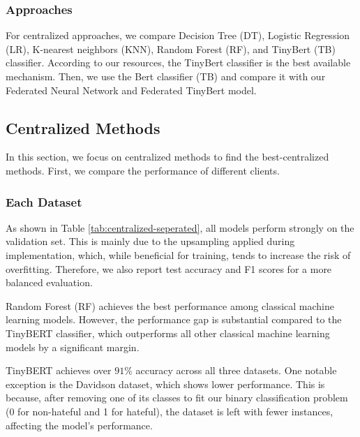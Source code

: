 \documentclass[11pt]{article}
\begin{document}
\subsubsection{Approaches}
For centralized approaches, we compare Decision Tree (DT), Logistic Regression (LR), K-nearest neighbors (KNN), Random Forest (RF), and TinyBert (TB) classifier. According to our resources, the TinyBert classifier is the best available mechanism. Then, we use the Bert classifier (TB) and compare it with our Federated Neural Network and Federated TinyBert model. 

\subsection{Centralized Methods}
In this section, we focus on centralized methods to find the best-centralized methods. First, we compare the performance of different clients.
\subsubsection{Each Dataset}
As shown in Table \ref{tab:centralized-seperated}, all models perform strongly on the validation set. This is mainly due to the upsampling applied during implementation, which, while beneficial for training, tends to increase the risk of overfitting. Therefore, we also report test accuracy and F1 scores for a more balanced evaluation.

Random Forest (RF) achieves the best performance among classical machine learning models. However, the performance gap is substantial compared to the TinyBERT classifier, which outperforms all other classical machine learning models by a significant margin.

TinyBERT achieves over $91\%$ accuracy across all three datasets. One notable exception is the Davidson dataset, which shows lower performance. This is because, after removing one of its classes to fit our binary classification problem (0 for non-hateful and 1 for hateful), the dataset is left with fewer instances, affecting the model's performance.
\end{document}
